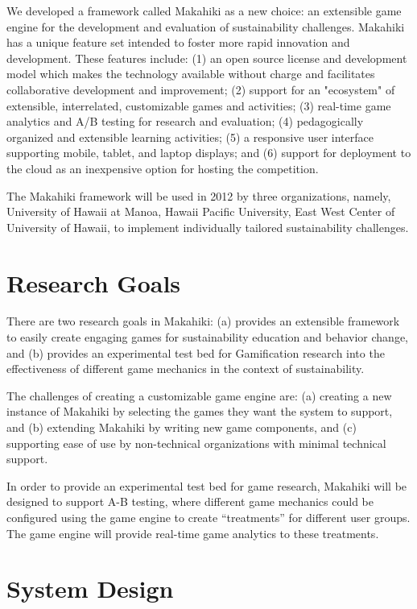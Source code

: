 \documentclass[11pt,final]{article}
\begin{document}
We developed a framework called Makahiki as a new choice: an extensible game engine for the development and evaluation of sustainability challenges. Makahiki has a unique feature set intended to foster more rapid innovation and development. These features include: (1) an open source license and development model which makes the technology available without charge and facilitates collaborative development and improvement; (2) support for an "ecosystem" of extensible, interrelated, customizable games and activities; (3) real-time game analytics and A/B testing for research and evaluation; (4) pedagogically organized and extensible learning activities; (5) a responsive user interface supporting mobile, tablet, and laptop displays; and (6) support for deployment to the cloud as an inexpensive option for hosting the competition.

The Makahiki framework will be used in 2012 by three organizations, namely, University of Hawaii at Manoa, Hawaii Pacific University, East West Center of University of Hawaii, to implement individually tailored sustainability challenges. 

\section{Research Goals}

There are two research goals in Makahiki: (a) provides an extensible framework to easily create engaging games for sustainability education and behavior change, and (b) provides an experimental test bed for Gamification research into the effectiveness of different game mechanics in the context of sustainability.

The challenges of creating a customizable game engine are:  (a) creating a new instance of Makahiki by selecting the games they want the system to support, and (b) extending Makahiki by writing new game components, and (c) supporting ease of use by non-technical organizations with minimal technical support.

In order to provide an experimental test bed for game research, Makahiki will be designed to support A-B testing, where different game mechanics could be configured using the game engine to create ``treatments'' for different user groups. The game engine will provide real-time game analytics to these treatments.

\section{System Design}
\end{document}
